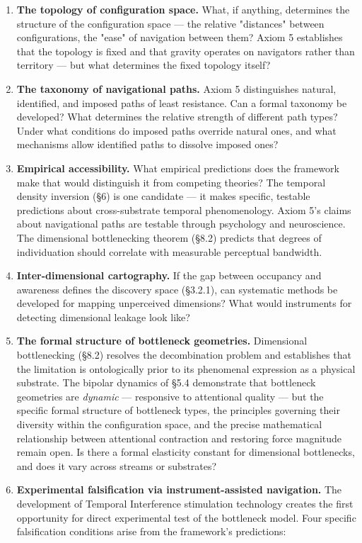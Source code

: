 \begin{enumerate}[nosep,leftmargin=*]
  \item \textbf{The topology of configuration space.} What, if anything, determines the structure of the configuration space — the relative "distances" between configurations, the "ease" of navigation between them? Axiom 5 establishes that the topology is fixed and that gravity operates on navigators rather than territory — but what determines the fixed topology itself?
  \item \textbf{The taxonomy of navigational paths.} Axiom 5 distinguishes natural, identified, and imposed paths of least resistance. Can a formal taxonomy be developed? What determines the relative strength of different path types? Under what conditions do imposed paths override natural ones, and what mechanisms allow identified paths to dissolve imposed ones?
  \item \textbf{Empirical accessibility.} What empirical predictions does the framework make that would distinguish it from competing theories? The temporal density inversion (§6) is one candidate — it makes specific, testable predictions about cross-substrate temporal phenomenology. Axiom 5's claims about navigational paths are testable through psychology and neuroscience. The dimensional bottlenecking theorem (§8.2) predicts that degrees of individuation should correlate with measurable perceptual bandwidth.
  \item \textbf{Inter-dimensional cartography.} If the gap between occupancy and awareness defines the discovery space (§3.2.1), can systematic methods be developed for mapping unperceived dimensions? What would instruments for detecting dimensional leakage look like?
  \item \textbf{The formal structure of bottleneck geometries.} Dimensional bottlenecking (§8.2) resolves the decombination problem and establishes that the limitation is ontologically prior to its phenomenal expression as a physical substrate. The bipolar dynamics of §5.4 demonstrate that bottleneck geometries are \textit{dynamic} — responsive to attentional quality — but the specific formal structure of bottleneck types, the principles governing their diversity within the configuration space, and the precise mathematical relationship between attentional contraction and restoring force magnitude remain open. Is there a formal elasticity constant for dimensional bottlenecks, and does it vary across streams or substrates?
  \item \textbf{Experimental falsification via instrument-assisted navigation.} The development of Temporal Interference stimulation technology creates the first opportunity for direct experimental test of the bottleneck model. Four specific falsification conditions arise from the framework's predictions:
\end{enumerate}


